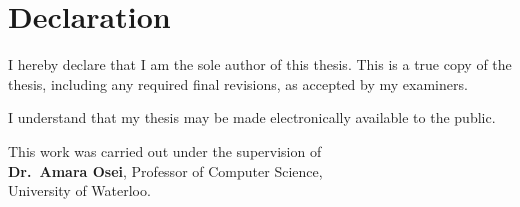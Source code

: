\chapter*{Declaration}

I hereby declare that I am the sole author of this thesis. This is a true copy of the thesis, including any required final revisions, as accepted by my examiners.

I understand that my thesis may be made electronically available to the public.

\vspace{2\baselineskip}
\noindent This work was carried out under the supervision of\\[6pt]
\textbf{Dr.~Amara Osei}, Professor of Computer Science,\\[2pt]
University of Waterloo.

